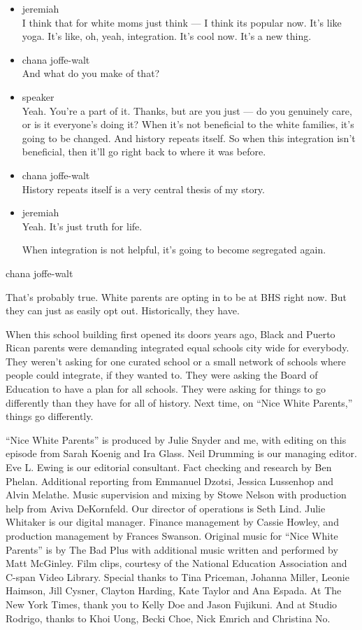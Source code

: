\begin{itemize}
\item
  jeremiah\\
  I think that for white moms just think --- I think its popular now.
  It's like yoga. It's like, oh, yeah, integration. It's cool now. It's
  a new thing.
\item
  chana joffe-walt\\
  And what do you make of that?
\item
  speaker\\
  Yeah. You're a part of it. Thanks, but are you just --- do you
  genuinely care, or is it everyone's doing it? When it's not beneficial
  to the white families, it's going to be changed. And history repeats
  itself. So when this integration isn't beneficial, then it'll go right
  back to where it was before.
\item
  chana joffe-walt\\
  History repeats itself is a very central thesis of my story.
\item
  jeremiah\\
  Yeah. It's just truth for life.

  When integration is not helpful, it's going to become segregated
  again.
\end{itemize}

chana joffe-walt

That's probably true. White parents are opting in to be at BHS right
now. But they can just as easily opt out. Historically, they have.

When this school building first opened its doors years ago, Black and
Puerto Rican parents were demanding integrated equal schools city wide
for everybody. They weren't asking for one curated school or a small
network of schools where people could integrate, if they wanted to. They
were asking the Board of Education to have a plan for all schools. They
were asking for things to go differently than they have for all of
history. Next time, on ``Nice White Parents,'' things go differently.

``Nice White Parents'' is produced by Julie Snyder and me, with editing
on this episode from Sarah Koenig and Ira Glass. Neil Drumming is our
managing editor. Eve L. Ewing is our editorial consultant. Fact checking
and research by Ben Phelan. Additional reporting from Emmanuel Dzotsi,
Jessica Lussenhop and Alvin Melathe. Music supervision and mixing by
Stowe Nelson with production help from Aviva DeKornfeld. Our director of
operations is Seth Lind. Julie Whitaker is our digital manager. Finance
management by Cassie Howley, and production management by Frances
Swanson. Original music for ``Nice White Parents'' is by The Bad Plus
with additional music written and performed by Matt McGinley. Film
clips, courtesy of the National Education Association and C-span Video
Library. Special thanks to Tina Priceman, Johanna Miller, Leonie
Haimson, Jill Cysner, Clayton Harding, Kate Taylor and Ana Espada. At
The New York Times, thank you to Kelly Doe and Jason Fujikuni. And at
Studio Rodrigo, thanks to Khoi Uong, Becki Choe, Nick Emrich and
Christina No.

